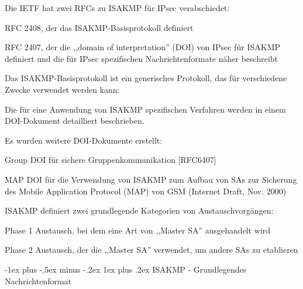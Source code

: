 \documentclass[a4paper]{article}
\makeatletter
\renewcommand{\subsubsection}{\@startsection{subsubsection}{3}{0mm}%
 {-1ex plus -.5ex minus -.2ex}%
 {1ex plus .2ex}%
 {\normalfont\small\bfseries}}
\makeatother
\begin{document}
\begin{multicols}{3}
      \begin{itemize*}
            \item Die IETF hat zwei RFCs zu ISAKMP für IPsec verabschiedet:
            \begin{itemize*}
                  \item RFC 2408, der das ISAKMP-Basisprotokoll definiert
                  \item RFC 2407, der die ,,domain of interpretation'' (DOI) von IPsec für ISAKMP definiert und die für IPsec spezifischen Nachrichtenformate näher beschreibt
            \end{itemize*}
            \item Das ISAKMP-Basisprotokoll ist ein generisches Protokoll, das für
            verschiedene Zwecke verwendet werden kann:
            \begin{itemize*}
                  \item Die für eine Anwendung von ISAKMP spezifischen Verfahren werden in einem DOI-Dokument detailliert beschrieben.
                  \item Es wurden weitere DOI-Dokumente erstellt:
                  \begin{itemize*} \item Group DOI für sichere Gruppenkommunikation {[}RFC6407{]} \item MAP DOI für die Verwendung von ISAKMP zum Aufbau von SAs zur Sicherung des Mobile Application Protocol (MAP) von GSM (Internet Draft, Nov. 2000) \end{itemize*}
            \end{itemize*}
            \item ISAKMP definiert zwei grundlegende Kategorien von Austauschvorgängen:
            \begin{itemize*}
                  \item Phase 1 Austausch, bei dem eine Art von ,,Master SA'' ausgehandelt wird
                  \item Phase 2 Austausch, der die ,,Master SA'' verwendet, um andere SAs zu etablieren
            \end{itemize*}
      \end{itemize*}


      \subsubsection{ISAKMP - Grundlegendes
            Nachrichtenformat}


\end{multicols}
\end{document}
